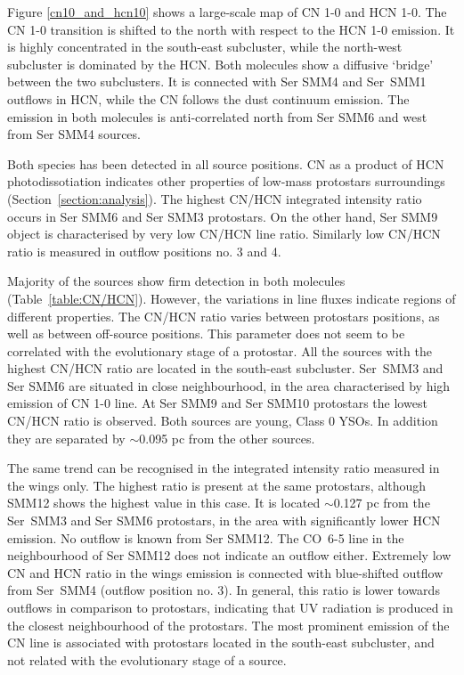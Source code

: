 \documentclass{aa}
\begin{document}
Figure \ref{cn10_and_hcn10} shows a large-scale map of CN 1-0 and HCN 1-0. The CN 1-0 transition is shifted to the north with respect to the HCN 1-0 emission. It is
highly concentrated in the south-east subcluster, while the north-west subcluster is dominated by the HCN. Both
molecules show a diffusive ‘bridge’ between the two subclusters. It is connected with Ser SMM4 and
Ser~SMM1 outflows in HCN, while the CN follows the dust continuum emission. The emission in both
molecules is anti-correlated north from Ser SMM6 and west from Ser SMM4 sources. 

Both species has been detected in all source positions. CN as a product of HCN photodissotiation
indicates other properties of low-mass protostars surroundings (Section~\ref{section:analysis}). The highest CN/HCN
integrated intensity ratio occurs in Ser SMM6 and Ser SMM3 protostars. On the other hand, Ser SMM9 object is characterised by very low CN/HCN line ratio.
Similarly low CN/HCN ratio is measured in outflow positions no. 3 and 4.

Majority of the sources show firm detection in both molecules (Table~\ref{table:CN/HCN}). However,
the variations in line fluxes indicate regions of different properties. The CN/HCN ratio varies
between protostars positions, as well as between off-source positions. This parameter does not seem to be correlated with the
evolutionary stage of a protostar. All the sources with the highest CN/HCN ratio are located in the south-east subcluster. Ser~SMM3 and Ser SMM6 are situated in close neighbourhood, in the area characterised
by high emission of CN 1-0 line. At Ser SMM9 and Ser SMM10 protostars the lowest CN/HCN ratio is
observed. Both sources are young, Class 0 YSOs. In addition they are separated by $\sim$0.095 pc from the other sources.

The same trend can be recognised in the integrated intensity ratio measured in the wings only. The highest ratio is present at the same protostars, although SMM12 shows the highest value in this case. It is located $\sim$0.127 pc from the Ser~SMM3 and Ser SMM6 protostars, in the area with significantly lower HCN emission. No outflow is known from Ser SMM12. The \mbox{CO 6-5} line in the neighbourhood of Ser SMM12 does not indicate an outflow either. Extremely low CN and HCN ratio in the wings emission is connected with blue-shifted outflow from Ser~SMM4 (outflow position no. 3). In general, this ratio is lower towards outflows in comparison to protostars, indicating that UV radiation is produced in the closest neighbourhood of the protostars. The most prominent emission of the CN line is associated with protostars located in the south-east subcluster, and not related with the evolutionary stage of a source.
\end{document}
